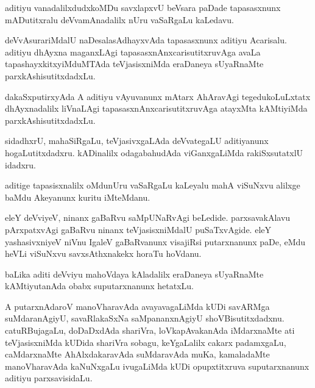 \documentclass{article}
\begin{document}
\begin{mn}
aditiyu vanadalilxdudxkoMDu savxlapxvU beVsara paDade tapasasxnunx
mADutitxralu deVvamAnadalilx nUru vaSaRgaLu kaLedavu.
\end{mn}

\begin{mn}
deVvAsurariMdalU naDesalasAdhayxvAda tapasasxnunx aditiyu Acarisalu.
aditiyu dhAyxna maganxLAgi tapasasxnAnxcarisutitxruvAga avaLa 
tapashayxkitxyiMduMTAda teVjasisxniMda eraDaneya  sUyaRnaMte parxkAshisutitxdadxLu.
\end{mn}

\begin{mn}
dakaSxputirxyAda A aditiyu vAyuvanunx mAtarx AhAravAgi tegedukoLuLxtatx
dhAyxnadalilx liVnaLAgi tapasasxnAnxcarisutitxruvAga atayxMta kAMtiyiMda 
parxkAshisutitxdadxLu.
\end{mn}

\begin{mn}
sidadhxrU, mahaSiRgaLu, teVjasivxgaLAda deVvategaLU aditiyanunx 
hogaLutitxdadxru. kADinalilx odagabahudAda viGanxgaLiMda rakiSxsutatxlU
idadxru.
\end{mn}

\begin{mn}
aditige tapasisxnalilx oMdunUru vaSaRgaLu kaLeyalu mahA viSuNxvu alilxge 
baMdu Akeyanunx kuritu iMteMdanu.
\end{mn}

\begin{mn}
eleY deVviyeV, ninanx gaBaRvu saMpUNaRvAgi beLedide. parxsavakAlavu 
pArxpatxvAgi gaBaRvu ninanx teVjasisxniMdalU puSaTxvAgide. eleY yashasivxniyeV
niVnu IgaleV gaBaRvanunx visajiRsi putarxnanunx paDe, eMdu heVLi viSuNxvu 
savxsAthxnakekx horaTu hoVdanu.
\end{mn}

\begin{mn}
baLika aditi deVviyu mahoVdaya kAladalilx eraDaneya sUyaRnaMte 
kAMtiyutanAda obabx suputarxnanunx hetatxLu.
\end{mn}

\begin{mn}
A putarxnAdaroV manoVharavAda avayavagaLiMda kUDi savARMga suMdaranAgiyU,
savaRlakaSxNa saMpananxnAgiyU shoVBisutitxdadxnu. catuRBujagaLu, doDaDxdAda
shariVra, loVkapAvakanAda iMdarxnaMte ati teVjasisxniMda kUDida shariVra 
sobagu, keYgaLalilx cakarx padamxgaLu, caMdarxnaMte  AhAlxdakaravAda 
suMdaravAda muKa, kamaladaMte manoVharavAda kaNuNxgaLu ivugaLiMda kUDi 
opupxtitxruva suputarxnanunx aditiyu parxsavisidaLu.
\end{mn}
\end{document}
